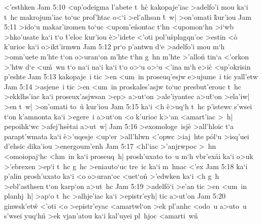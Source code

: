 <'esthken\bibvsend
\vs Jam 5:10
<up'odeigma
l'abete
t~hc\r{}
kakopaje'iac
>adelfo'i
mou
ka`i
t~hc
makrojum'iac
to`uc
prof'htac
o<`i
>el'alhsan
\r{t}~w|
>on'omati
\r{k}ur'iou\bibvsend
{}
\vs Jam 5:11
>ido`u
makar'izomen
to`uc
<upom'e\r{n}ontac
t`hn
<upomon`hn
>i`wb
>hko'usate
ka`i
t`o
\r{t}'eloc
kur'iou
\r{e}>'idete
<'oti
pol'u\r{s}plagqn'oc
>estin
<o\r{}
k'urioc
ka`i
o>ikt'irmwn\bibvsend
\vs Jam 5:12
pr`o
p'antwn
d`e
>adelfo'i
mou
m`h
>omn'uete
m'hte
t`on
o>uran`on
m'hte
t`hn
g~hn
m'hte
>'allon\r{}
tin`a
<'orkon
>'htw
d`e
<u\r{m}~wn
t`o
na`i
na`i
ka`i
t`o
o>`u
o>`u
<'ina
m`h
e>ic\r{}
<up'okrisin
p'eshte\bibvsend
\vs Jam 5:13
kakopaje~i
tic
>en
<um~in
proseuq'esjw
e>ujume~i
tic
yall'etw\bibvsend
\vs Jam 5:14
>asjene~i
tic
>en
<um~in
proskales'asjw
to`uc
presbut'erouc
t~hc
>ekklhs'iac
ka`i
proseux'asjwsan
>ep>
a>ut`on
>ale'iyantec
a>u\r{t}`on
>ela'iw|
>en
t~w|
>on'omati
to~u\r{}
kur'iou\bibvsend
\vs Jam 5:15
ka`i
<h
\r{e}>uq`h
t~hc
p'istewc
s'wsei
t`on
k'amnonta
ka`i
>egere~i
a>ut`on
<o
k'urioc
k>`an
<amart'iac
>~h|
pepoihk`wc
>afej'hs\r{e}tai
a>ut~w|\bibvsend
\vs Jam 5:16
>exomologe~isje\r{}
>all'hloic
t`a
parapt'wmata
ka`i
\r{e}>'uqesje
<up`er
>all'hlwn
<'opwc
>iaj~hte
p\r{o}l`u
>isq'uei
d'ehsic
dika'iou
>energoum'enh\bibvsend
\vs Jam 5:17
<hl'iac
>'anjrwpoc
>~hn
<omoiopaj`hc
<hm~in
ka`i
proseuq~h|
prosh'uxato
to~u
m`h
vbr'ex\r{a}i
ka`i
o>uk
>'ebrexen
>ep`i
t~hc
g~hc
>eniauto`uc
tre~ic
ka`i
m~hnac
<'ex\bibvsend
\vs Jam 5:18
ka`i
p'alin
prosh'uxato
ka`i
<o
o>uran`oc
<uet`on\r{}
>'edwken
ka`i
<h
g~h
>ebl'asthsen
t`on
karp`on
a>ut~hc\bibvsend
\vs Jam 5:19
>adelf\r{o}`i
>e'an
tic
>en
<um~in
planhj~h|
>ap`o
t~hc
>alhje'iac
ka`i
>epistr'eyh|
tic
a>ut'on\bibvsend
\vs Jam 5:20
ginwsk'etw\r{}
<'oti
<o
>epistr'eyac
<amartwl`on
>ek
pl'anhc
<odo~u
a>uto~u
s'wsei
yuq`h\r{n}
>ek
vjan'atou
ka`i
kal'uyei
pl~hjoc
<amarti~w\r{n}\bibvsend
{}
